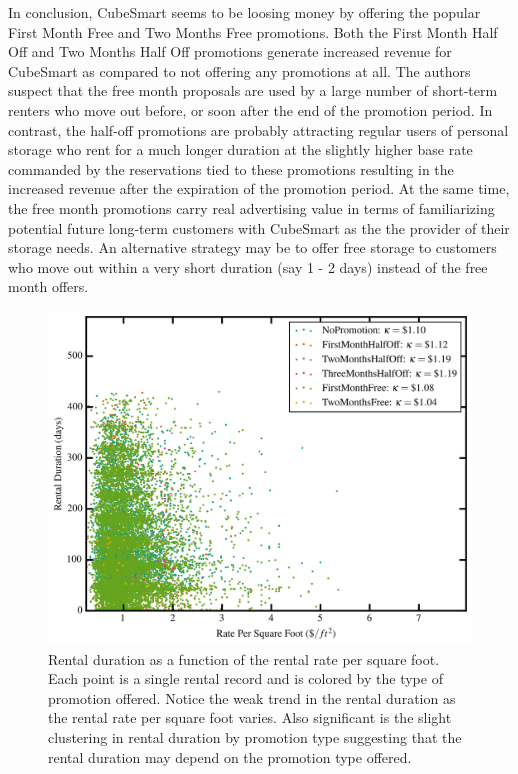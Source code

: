 \documentclass[times]{aastex6}
\begin{document}
In conclusion, CubeSmart seems to be loosing money by offering the popular First Month Free and Two Months Free promotions. Both the First Month Half Off and Two Months Half Off promotions generate increased revenue for CubeSmart as compared to not offering any promotions at all. The authors suspect that the free month proposals are used by a large number of short-term renters who move out before, or soon after the end of the promotion period. In contrast, the half-off promotions are probably attracting regular users of personal storage who rent for a much longer duration at the slightly higher base rate commanded by the reservations tied to these promotions resulting in the increased revenue after the expiration of the promotion period. At the same time, the free month promotions carry real advertising value in terms of familiarizing potential future long-term customers with CubeSmart as the the provider of their storage needs. An alternative strategy may be to offer free storage to customers who move out within a very short duration (say 1 - 2 days) instead of the free month offers.

\begin{figure}
	\includegraphics[width=0.9\columnwidth]{plots/FootRateVSDurations.jpg}
    \caption{Rental duration as a function of the rental rate per square foot. Each point is a single rental record and is colored by the type of promotion offered. Notice the weak trend in the rental duration as the rental rate per square foot varies. Also significant is the slight clustering in rental duration by promotion type suggesting that the rental duration may depend on the promotion type offered.}
    \label{fig:FootRateVSDuration}
\end{figure}
\end{document}
